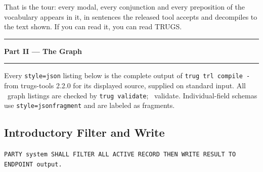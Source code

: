 \documentclass{article}
\begin{document}
That is the tour: every modal, every conjunction and every preposition of the vocabulary appears in it, in sentences the released tool accepts and decompiles to the text shown. If you can read it, you can read TRUGS.

\bigskip
\noindent\rule{\textwidth}{0.4pt}
\begin{center}\Large\textbf{Part II --- The Graph}\end{center}
\noindent\rule{\textwidth}{0.4pt}
\bigskip

Every \texttt{style=json} listing below is the complete output of \texttt{trug trl compile -} from trugs-tools 2.2.0 for its displayed source, supplied on standard input. All \GraphsTotal\ graph listings are checked by \texttt{trug validate}; \GraphsValid\ validate. Individual-field schemas use \texttt{style=jsonfragment} and are labeled as fragments.

\subsection{Introductory Filter and Write}
\label{app:intro-graph}

\texttt{PARTY system SHALL FILTER ALL ACTIVE RECORD
  THEN WRITE RESULT TO ENDPOINT output.}
\end{document}
